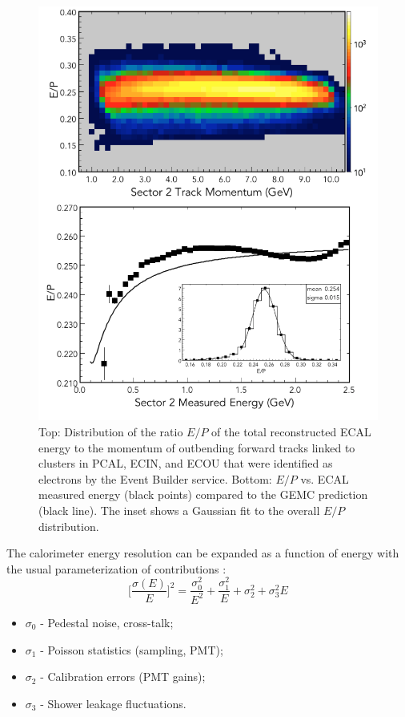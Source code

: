 \begin{figure}[t]
\centering
\includegraphics[width=1.0\columnwidth,keepaspectratio]{img/S10_1_0.png}
\caption[]{Top: Distribution of the ratio $E/P$ of the total reconstructed ECAL energy to the momentum of
  outbending forward tracks linked to clusters in PCAL, ECIN, and ECOU that were identified as electrons by the
  Event Builder service. Bottom: $E/P$ vs. ECAL measured energy (black points) compared to the GEMC prediction (black line). The inset
  shows a Gaussian fit to the overall $E/P$ distribution.}
\label{fig:S10_1_0}
\end{figure}

The calorimeter energy resolution can be expanded as a function of energy with the usual parameterization of
contributions \cite{ps1981}:
\begin{equation}
\biggl[\frac{\sigma(E)}{E}\biggr]^2 = \frac{\sigma^2_0}{E^2} + \frac{\sigma^2_1}{E} +\sigma^2_2 + \sigma^2_3 E 
\label{eq:sferror}
\end{equation}

\begin{itemize}
\item $\sigma_0$ - Pedestal noise, cross-talk;
\item $\sigma_1$ - Poisson statistics (sampling, PMT);
\item $\sigma_2$ - Calibration errors (PMT gains);
\item $\sigma_3$ - Shower leakage fluctuations.
\end{itemize}

